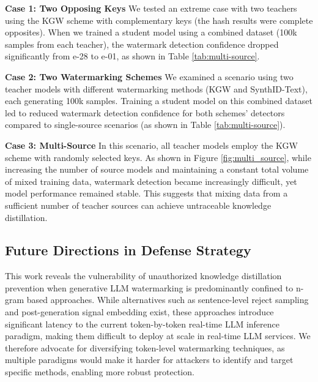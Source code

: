 \vspace{3pt}

\noindent\textbf{Case 1: Two Opposing Keys} \quad We tested an extreme case with two teachers using the KGW scheme with complementary  keys (the hash results were complete opposites). When we trained a student model using a combined dataset (100k samples from each teacher), the watermark detection confidence dropped significantly from e-28 to e-01, as shown in Table \ref{tab:multi-source}.

\vspace{3pt}

\noindent\textbf{Case 2: Two Watermarking Schemes} \quad We examined a scenario using two teacher models with different watermarking methods (KGW and SynthID-Text), each generating 100k samples. Training a student model on this combined dataset led to reduced watermark detection confidence for both schemes' detectors compared to single-source scenarios (as shown in Table \ref{tab:multi-source}).

\vspace{3pt}

\noindent\textbf{Case 3: Multi-Source} \quad In this scenario, all teacher models employ the KGW scheme with randomly selected keys. As shown in Figure \ref{fig:multi_source}, while increasing the number of source models and maintaining a constant total volume of mixed training data, watermark detection became increasingly difficult, yet model performance remained stable. This suggests that mixing data from a sufficient number of teacher sources can achieve untraceable knowledge distillation.

\vspace{-3pt}

\subsection{Future Directions in Defense Strategy}
\label{sec:defense}
This work reveals the vulnerability of unauthorized knowledge distillation prevention when generative LLM watermarking is predominantly confined to n-gram based approaches. While alternatives such as sentence-level reject sampling \cite{hou2023semstamp,hou-etal-2024-k} and post-generation signal embedding \cite{chang2024postmark} exist, these approaches introduce significant latency to the current token-by-token real-time LLM inference paradigm, making them difficult to deploy at scale in real-time LLM services. We therefore advocate for diversifying token-level watermarking techniques, as multiple paradigms would make it harder for attackers to identify and target specific methods, enabling more robust protection.
